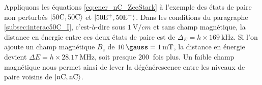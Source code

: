 Appliquons les équations \eqref{eq:ener_nC_ZeeStark} à l'exemple des états de paire non perturbés $\ket{\mathrm{50C,50C}}$ et $\ket{\mathrm{50E^+,50E^-}}$.
Dans les conditions du paragraphe \ref{subsec:interac50C_I}, c'est-à-dire sous $\SI{1}{\V/cm}$ et sans champ magnétique, la distance en énergie entre ces deux états de paire est de $\Delta_E = h\times\SI{169}{\kHz}$.
Si l'on ajoute un champ magnétique $B_z$ de $\SI{10}{\gauss}=\SI{1}{\milli\tesla}$, la distance en énergie devient $\Delta E = h\times \SI{28.17}{\MHz}$, soit presque $\SI{200}{}$ fois plus.
Un faible champ magnétique nous permet ainsi de lever la dégénérescence entre les niveaux de  paire voisins de $\ket{\mathrm{nC,nC}}$.

%

